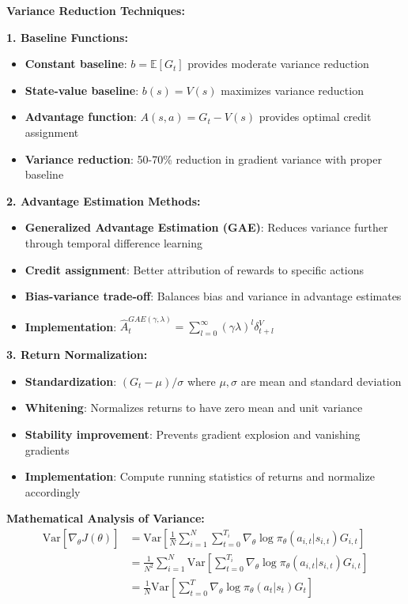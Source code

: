 \documentclass[12pt]{article}
\begin{document}
{{{\textbf{Variance Reduction Techniques:}

\textbf{1. Baseline Functions:}
\begin{itemize}
    \item \textbf{Constant baseline}: $b = \mathbb{E}[G_t]$ provides moderate variance reduction
    \item \textbf{State-value baseline}: $b(s) = V(s)$ maximizes variance reduction
    \item \textbf{Advantage function}: $A(s,a) = G_t - V(s)$ provides optimal credit assignment
    \item \textbf{Variance reduction}: 50-70\% reduction in gradient variance with proper baseline
\end{itemize}

\textbf{2. Advantage Estimation Methods:}
\begin{itemize}
    \item \textbf{Generalized Advantage Estimation (GAE)}: Reduces variance further through temporal difference learning
    \item \textbf{Credit assignment}: Better attribution of rewards to specific actions
    \item \textbf{Bias-variance trade-off}: Balances bias and variance in advantage estimates
    \item \textbf{Implementation}: $\hat{A}_t^{GAE(\gamma,\lambda)} = \sum_{l=0}^{\infty} (\gamma\lambda)^l \delta_{t+l}^V$
\end{itemize}

\textbf{3. Return Normalization:}
\begin{itemize}
    \item \textbf{Standardization}: $(G_t - \mu)/\sigma$ where $\mu, \sigma$ are mean and standard deviation
    \item \textbf{Whitening}: Normalizes returns to have zero mean and unit variance
    \item \textbf{Stability improvement}: Prevents gradient explosion and vanishing gradients
    \item \textbf{Implementation}: Compute running statistics of returns and normalize accordingly
\end{itemize}

\textbf{Mathematical Analysis of Variance:}
\begin{align}
\text{Var}[\hat{\nabla}_\theta J(\theta)] &= \text{Var}\left[\frac{1}{N} \sum_{i=1}^{N} \sum_{t=0}^{T_i} \nabla_\theta \log \pi_\theta(a_{i,t}|s_{i,t}) G_{i,t}\right] \\
&= \frac{1}{N^2} \sum_{i=1}^{N} \text{Var}\left[\sum_{t=0}^{T_i} \nabla_\theta \log \pi_\theta(a_{i,t}|s_{i,t}) G_{i,t}\right] \\
&= \frac{1}{N} \text{Var}\left[\sum_{t=0}^{T} \nabla_\theta \log \pi_\theta(a_t|s_t) G_t\right]
\end{align}

}}}
\end{document}
